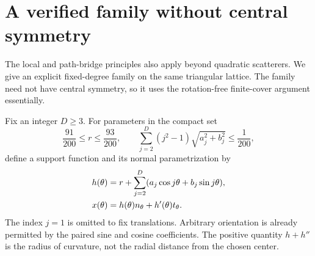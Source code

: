 \section{A verified family without central symmetry}
\label{sec:v36-nonelliptic-family}
The local and path-bridge principles also apply beyond quadratic
scatterers. We give an explicit fixed-degree family on the same
triangular lattice. The family need not have central symmetry, so it
uses the rotation-free finite-cover argument essentially.

Fix an integer $D\ge3$. For parameters in the compact set
\begin{equation}\label{eq:v36-support-parameters}
 \frac{91}{200}\le r\le\frac{93}{200},\qquad
 \sum_{j=2}^D(j^2-1)\sqrt{a_j^2+b_j^2}\le\frac1{200},
\end{equation}
define a support function and its normal parametrization by
\begin{align}
 h(\theta)&=r+\sum_{j=2}^D(a_j\cos j\theta+b_j\sin j\theta),\notag\\
 x(\theta)&=h(\theta)n_\theta+h'(\theta)t_\theta.
                                                \label{eq:v36-support-curve}
\end{align}
The index $j=1$ is omitted to fix translations. Arbitrary orientation
is already permitted by the paired sine and cosine coefficients.
The positive quantity $h+h''$ is the radius of curvature, not the
radial distance from the chosen center.

